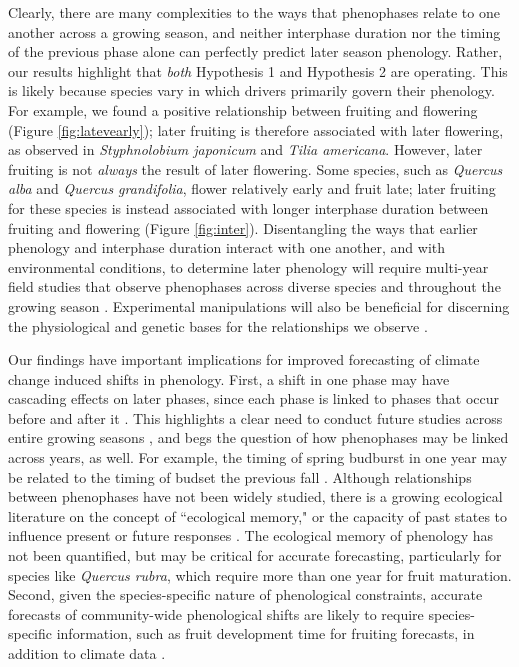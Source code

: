 \documentclass{article}
\begin{document}
\par Clearly, there are many complexities to the ways that phenophases relate to one another across a growing season, and neither interphase duration nor the timing of the previous phase alone can perfectly predict later season phenology. Rather, our results highlight that \textit{both} Hypothesis 1 and Hypothesis 2 are operating. This is likely because species vary in which drivers primarily govern their phenology. For example, we found a positive relationship between fruiting and flowering (Figure \ref{fig:latevearly}); later fruiting is therefore associated with later flowering, as observed in \textit{Styphnolobium japonicum} and \textit{Tilia americana}. However, later fruiting is not \textit{always} the result of later flowering. Some species, such as \textit{Quercus alba} and \textit{Quercus grandifolia}, flower relatively early and fruit late; later fruiting for these species is instead associated with longer interphase duration between fruiting and flowering (Figure \ref{fig:inter}). Disentangling the ways that earlier phenology and interphase duration interact with one another, and with environmental conditions, to determine later phenology will require multi-year field studies that observe phenophases across diverse species and throughout the growing season \citep[e.g.][]{elmendorf2016}. Experimental manipulations will also be beneficial for discerning the physiological and genetic bases for the relationships we observe \citep{flint1974}.

\par Our findings have important implications for improved forecasting of climate change induced shifts in phenology. First, a shift in one phase may have cascading effects on later phases, since each phase is linked to phases that occur before and after it \citep{wolkovich2014b}. This highlights a clear need to conduct future studies across entire growing seasons \citep{wolkovich2014}, and begs the question of how phenophases may be linked across years, as well.  For example, the timing of spring budburst in one year may be related to the timing of budset the previous fall \citep {mimura2010}. Although relationships between phenophases have not been widely studied, there is a growing ecological literature on the concept of ``ecological memory," or the capacity of past states to influence present or future responses \citep {ogle2015}. The ecological memory of phenology has not been quantified, but may be critical for accurate forecasting, particularly for species like \emph{Quercus rubra}, which require more than one year for fruit maturation. Second, given the species-specific nature of phenological constraints, accurate forecasts of community-wide phenological shifts are likely to require species-specific information, such as fruit development time for fruiting forecasts, in addition to climate data \citep{diez2012}.
\end{document}
